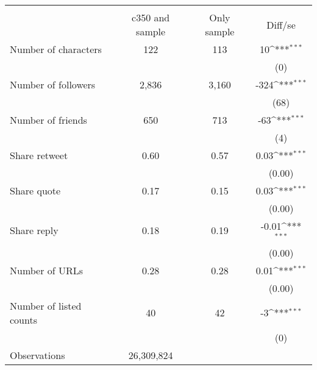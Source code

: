 {
\def\sym#1{\ifmmode^{#1}\else\(^{#1}\)\fi}
\begin{tabular}{l*{1}{ccc}}
\hline\hline
                    &\multicolumn{3}{c}{}                           \\
                    &c350 and sample& Only sample&     Diff/se         \\
\hline
Number of characters &         122&         113&          10\sym{***}\\
                    &            &            &         (0)         \\
Number of followers &       2,836&       3,160&        -324\sym{***}\\
                    &            &            &        (68)         \\
Number of friends   &         650&         713&         -63\sym{***}\\
                    &            &            &         (4)         \\
Share retweet       &        0.60&        0.57&        0.03\sym{***}\\
                    &            &            &      (0.00)         \\
Share quote         &        0.17&        0.15&        0.03\sym{***}\\
                    &            &            &      (0.00)         \\
Share reply         &        0.18&        0.19&       -0.01\sym{***}\\
                    &            &            &      (0.00)         \\
Number of URLs      &        0.28&        0.28&        0.01\sym{***}\\
                    &            &            &      (0.00)         \\
Number of listed counts&          40&          42&          -3\sym{***}\\
                    &            &            &         (0)         \\
\hline
Observations        &  26,309,824&            &                     \\
\hline\hline
\end{tabular}
}
